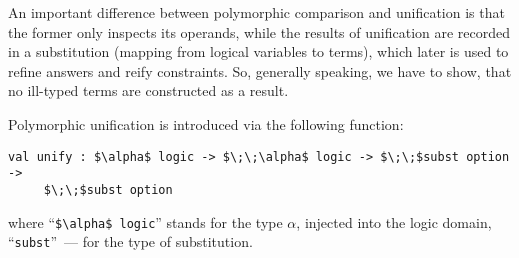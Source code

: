 \documentclass[10pt, oneside, nocopyrightspace]{sigplanconf}
\begin{document}
\begin{comment}
Like polymorphic comparison, polymorphic unification performs traversal
of values, exploiting intrinsic knowledge of their runtime representation. 
The undeniable benefit of this solution is that in order to perform unification 
for user types no ``boilerplate'' code is needed. 
\end{comment}
\begin{comment}
On the other hand, all pitfalls of
polymorphic comparison are inherited as well; in particular, unification can loop 
for cyclic data structures and does not work for functional values. Since we generally 
do not expect any reasonable outcome in these cases, the only remaining problem is that
the compiler is incapable to provide any assistance in identifying 
and avoiding them. Another drawback is that the implementation of polymorphic unification
relies on runtime representation of values and have to be fixed every time the representation changes. 
Finally, as it written in unsafe manner using \lstinline{Obj} interface, it has to be
carefully developed and tested.
\end{comment}

An important difference between polymorphic comparison and unification is that the former 
only inspects its operands, while the results of unification are recorded in a substitution
(mapping from logical variables to terms), which later is used to refine answers and reify 
constraints. So, generally speaking, we have to show, that no ill-typed terms are constructed 
as a result.

Polymorphic unification is introduced via the following function:

\begin{lstlisting}[mathescape=true]
   val unify : $\alpha$ logic -> $\;\;\alpha$ logic -> $\;\;$subst option -> 
     $\;\;$subst option
\end{lstlisting}

\noindent where ``\lstinline[mathescape=true]{$\alpha$ logic}'' stands for the type $\alpha$, 
injected into the logic domain, ``\lstinline{subst}''~--- for the type of substitution. 

\begin{comment}
Unification can 
fail (hence ``\lstinline{option}'' in the result type), is performed in the context of
existing substitution (hence ``\lstinline{subst}'' in the third argument) and
can be chained (hence ``\lstinline{option}'' in the third argument). Note, that the 
type of substitution is not polymorphic, which means, that compiler completely looses the 
track of types for values, stored in a substitution. These types are recovered later during
refinement of answers.
\end{comment}
\end{document}
